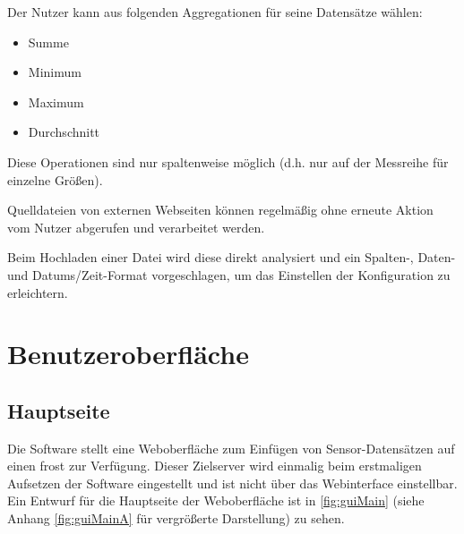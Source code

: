 \documentclass[a4paper, 12 pt]{article}
\begin{document}
	Der Nutzer kann aus folgenden Aggregationen für seine Datensätze wählen:
	\begin{itemize}
			\item Summe
			\item Minimum
			\item Maximum
			\item Durchschnitt
	\end{itemize}
	Diese Operationen sind nur spaltenweise möglich (d.h. nur auf der Messreihe für einzelne Größen).
	
	Quelldateien von externen Webseiten können regelmäßig ohne erneute Aktion vom Nutzer abgerufen und verarbeitet werden.
	
	Beim Hochladen einer Datei wird diese direkt analysiert und ein Spalten-, Daten- und Datums/Zeit-Format vorgeschlagen, um das Einstellen der Konfiguration zu erleichtern.
	
	
	
	
\section{Benutzeroberfläche}

\subsection{Hauptseite}
Die Software stellt eine Weboberfläche zum Einfügen von Sensor-Datensätzen auf einen \gls{frost} zur Verfügung. 
Dieser Zielserver wird einmalig beim erstmaligen Aufsetzen der Software eingestellt und ist nicht über das Webinterface einstellbar. 
Ein Entwurf für die Hauptseite der Weboberfläche ist in \cref{fig:guiMain} (siehe Anhang \cref{fig:guiMainA} für vergrößerte Darstellung) zu sehen.
\\
\end{document}
